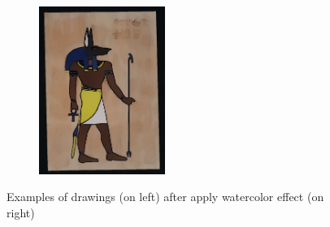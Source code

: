 \begin{figure}
\begin{subfigure}[b]{0.5\textwidth}
         \includegraphics[width=0.45\textwidth]{images/style_augments/2019_14-17_0188_RUS_R_C_water.jpg}
         \caption{}
     \end{subfigure}
     \caption{Examples of drawings (on left) after apply watercolor effect (on right)}
     \label{fig:water-style-effects}
\end{figure}


